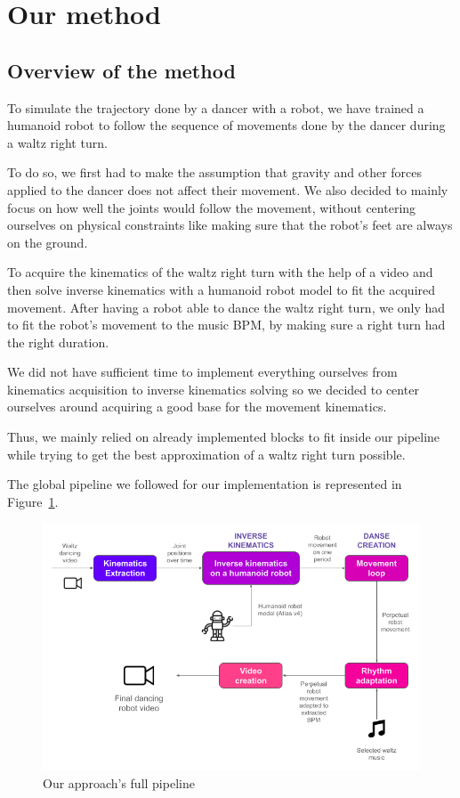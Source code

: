 \documentclass{amsart}
\theoremstyle{definition}
\theoremstyle{plain}
\begin{document}
\section{Our method}


\subsection{Overview of the method}
To simulate the trajectory done by a dancer with a robot, we have trained a humanoid robot to follow the sequence of movements done by the dancer during a waltz right turn.

To do so, we first had to make the assumption that gravity and other forces applied to the dancer does not affect their movement. We also decided to mainly focus on how well the joints would follow the movement, without centering ourselves on physical constraints like making sure that the robot's feet are always on the ground.

To acquire the kinematics of the waltz right turn with the help of a video and then solve inverse kinematics with a humanoid robot model to fit the acquired movement. 
After having a robot able to dance the waltz right turn, we only had to fit the robot's movement to the music BPM, by making sure a right turn had the right duration.

We did not have sufficient time to implement everything ourselves from kinematics acquisition to inverse kinematics solving so we decided to center ourselves around acquiring a good base for the movement kinematics. 

Thus, we mainly relied on already implemented blocks to fit inside our pipeline while trying to get the best approximation of a waltz right turn possible.

The global pipeline we followed for our implementation is represented in Figure~\ref{fig:pipeline}.

\begin{figure}
  \includegraphics[width = 0.75 \columnwidth]{img/final_solution_pipeline.png}
  \caption{Our approach's full pipeline}\label{fig:pipeline}
\end{figure}
\end{document}
